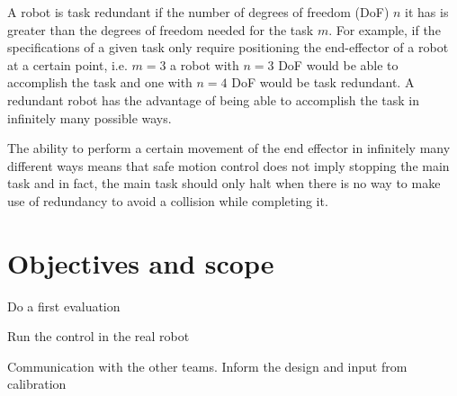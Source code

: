 A robot is task redundant if the number of degrees of freedom (DoF) $n$ it has is greater than the degrees of freedom needed for the task $m$. For example, if the specifications of a given task only require positioning the end-effector of a robot at a certain point, i.e. $m = 3$ a robot with $n = 3$ DoF would be able to accomplish the task and one with $n = 4$ DoF would be task redundant. A redundant robot has the advantage of being able to accomplish the task in infinitely many possible ways.

The ability to perform a certain movement of the end effector in infinitely many different ways means that safe motion control does not imply stopping the main task and in fact, the main task should only halt when there is no way to make use of redundancy to avoid a collision while completing it.

\section{Objectives and scope}


Do a first evaluation

Run the control in the real robot

Communication with the other teams. Inform the design and input from calibration
